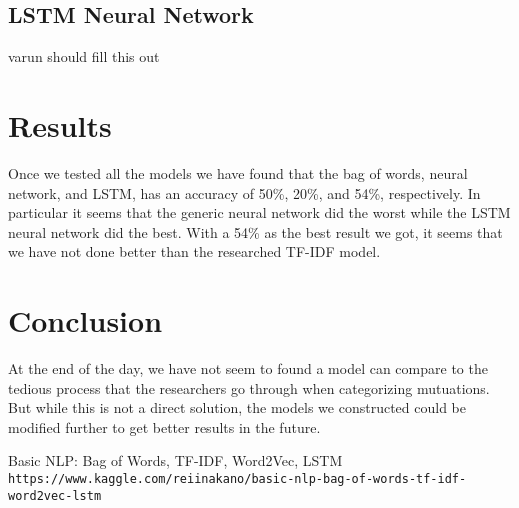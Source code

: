 \documentclass{article}
\begin{document}
    \subsection{LSTM Neural Network}
    varun should fill this out
    

    
    
    
    \section{Results}
    Once we tested all the models we have found that the bag of words, neural network, and LSTM, has an accuracy of 50\%, 20\%, and 54\%, respectively.  In particular it seems that the generic neural network did the worst while the LSTM neural network did the best.  With a 54\% as the best result we got, it seems that we have not done better than the researched TF-IDF model.  
    
    \section{Conclusion}
    At the end of the day, we have not seem to found a model can compare to the tedious process that the researchers go through when categorizing mutuations.  But while this is not a direct solution, the models we constructed could be modified further to get better results in the future.    
    
    \pagebreak
    \begin{thebibliography}{9}
        Basic NLP: Bag of Words, TF-IDF, Word2Vec, LSTM
        \\\texttt{https://www.kaggle.com/reiinakano/basic-nlp-bag-of-words-tf-idf-word2vec-lstm}
      
         
    \end{thebibliography}
    
    
\end{document}
